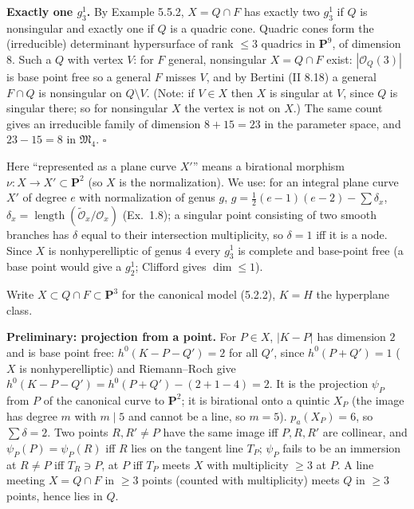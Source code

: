 \documentclass[11pt]{article}
\begin{document}
\textbf{Exactly one $g^1_3$.} By Example 5.5.2, $X=Q\cap F$ has exactly two $g^1_3$ if $Q$ is nonsingular and exactly one if $Q$ is a quadric cone. Quadric cones form the (irreducible) determinant hypersurface of rank $\le3$ quadrics in $\mathbf P^9$, of dimension $8$. Such a $Q$ with vertex $V$: for $F$ general, nonsingular $X=Q\cap F$ exist: $|\mathcal O_Q(3)|$ is base point free so a general $F$ misses $V$, and by Bertini (II 8.18) a general $F\cap Q$ is nonsingular on $Q\setminus V$. (Note: if $V\in X$ then $X$ is singular at $V$, since $Q$ is singular there; so for nonsingular $X$ the vertex is not on $X$.) The same count gives an irreducible family of dimension $8+15=23$ in the parameter space, and $23-15=8$ in $\mathfrak M_4$. \hfill$\square$

\pf
Here ``represented as a plane curve $X'$'' means a birational morphism $\nu:X\to X'\subset\mathbf P^2$ (so $X$ is the normalization). We use: for an integral plane curve $X'$ of degree $e$ with normalization of genus $g$, $g=\frac12(e-1)(e-2)-\sum\delta_x$, $\delta_x=\operatorname{length}(\tilde{\mathcal O}_x/\mathcal O_x)$ (Ex.~1.8); a singular point consisting of two smooth branches has $\delta$ equal to their intersection multiplicity, so $\delta=1$ iff it is a node. Since $X$ is nonhyperelliptic of genus $4$ every $g^1_3$ is complete and base-point free (a base point would give a $g^1_2$; Clifford gives $\dim\le1$).

Write $X\subset Q\cap F\subset\mathbf P^3$ for the canonical model (5.2.2), $K=H$ the hyperplane class.

\textbf{Preliminary: projection from a point.} For $P\in X$, $|K-P|$ has dimension $2$ and is base point free: $h^0(K-P-Q')=2$ for all $Q'$, since $h^0(P+Q')=1$ ($X$ is nonhyperelliptic) and Riemann--Roch give $h^0(K-P-Q')=h^0(P+Q')-(2+1-4)=2$. It is the projection $\psi_P$ from $P$ of the canonical curve to $\mathbf P^2$; it is birational onto a quintic $X_P$ (the image has degree $m$ with $m\mid5$ and cannot be a line, so $m=5$). $p_a(X_P)=6$, so $\sum\delta=2$. Two points $R,R'\ne P$ have the same image iff $P,R,R'$ are collinear, and $\psi_P(P)=\psi_P(R)$ iff $R$ lies on the tangent line $T_P$; $\psi_P$ fails to be an immersion at $R\ne P$ iff $T_R\ni P$, at $P$ iff $T_P$ meets $X$ with multiplicity $\ge3$ at $P$. A line meeting $X=Q\cap F$ in $\ge3$ points (counted with multiplicity) meets $Q$ in $\ge3$ points, hence lies in $Q$.
\end{document}
